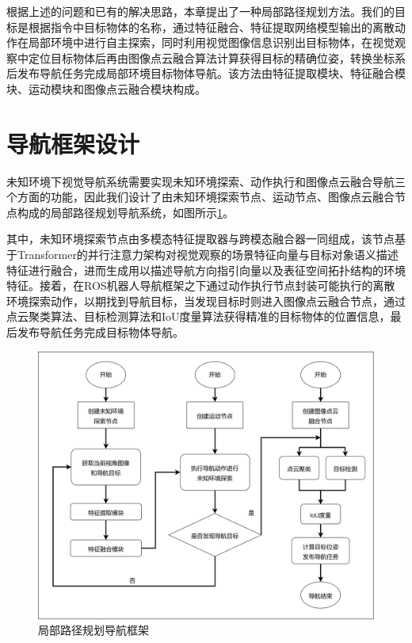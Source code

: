 根据上述的问题和已有的解决思路，本章提出了一种局部路径规划方法。我们的目标是根据指令中目标物体的名称，通过特征融合、特征提取网络模型输出的离散动作在局部环境中进行自主探索，同时利用视觉图像信息识别出目标物体，在视觉观察中定位目标物体后再由图像点云融合算法计算获得目标的精确位姿，转换坐标系后发布导航任务完成局部环境目标物体导航。该方法由特征提取模块、特征融合模块、运动模块和图像点云融合模块构成。


\section{导航框架设计}
未知环境下视觉导航系统需要实现未知环境探索、动作执行和图像点云融合导航三个方面的功能，因此我们设计了由未知环境探索节点、运动节点、图像点云融合节点构成的局部路径规划导航系统，如图所示\ref{局部路径规划导航方法}。

其中，未知环境探索节点由多模态特征提取器与跨模态融合器一同组成，该节点基于Transformer的并行注意力架构对视觉观察的场景特征向量与目标对象语义描述特征进行融合，进而生成用以描述导航方向指引向量以及表征空间拓扑结构的环境特征。接着，在ROS机器人导航框架之下通过动作执行节点封装可能执行的离散环境探索动作，以期找到导航目标，当发现目标时则进入图像点云融合节点，通过点云聚类算法、目标检测算法和IoU度量算法获得精准的目标物体的位置信息，最后发布导航任务完成目标物体导航。
\begin{figure}[htbp]
    \centering
    \includegraphics[scale=0.05]{Fig/未知环境导航框架.png}
    \caption{\label{局部路径规划导航方法}局部路径规划导航框架}
\end{figure}

